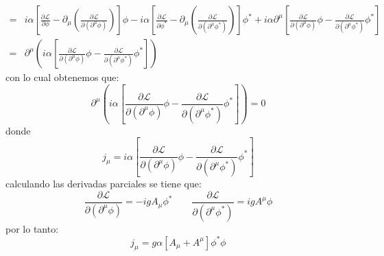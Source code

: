 \begin{itemize}
\begin{align*}
        =& i\alpha \left[ \frac{\partial \mathcal{L}}{\partial \phi} - \partial_\mu \left(\frac{\partial \mathcal{L}}{\partial (\partial^\mu \phi)}\right) \right] \phi-i\alpha \left[ \frac{\partial \mathcal{L}}{\partial \phi^*} - \partial_\mu \left(\frac{\partial \mathcal{L}}{\partial (\partial^\mu \phi^*)}\right) \right] \phi^*  + i\alpha \partial^\mu \left[ \frac{\partial \mathcal{L}}{\partial (\partial^\mu \phi)} \phi  - \frac{\partial \mathcal{L}}{\partial (\partial^\mu {\phi}^*)} {\phi}^* \right]\\
        =& \partial^\mu \left(i\alpha\left[ \frac{\partial \mathcal{L}}{\partial (\partial^\mu \phi)} \phi  - \frac{\partial \mathcal{L}}{\partial (\partial^\mu {\phi}^*)} {\phi}^* \right]\right)
    \end{align*}
    con lo cual obtenemos que:
    \begin{equation*}
        \partial^\mu \left(i\alpha\left[ \frac{\partial \mathcal{L}}{\partial (\partial^\mu \phi)} \phi  - \frac{\partial \mathcal{L}}{\partial (\partial^\mu {\phi}^*)} {\phi}^* \right]\right) = 0
    \end{equation*}
    donde 
     \begin{equation*}
         j_\mu = i\alpha\left[ \frac{\partial \mathcal{L}}{\partial (\partial^\mu \phi)} \phi  - \frac{\partial \mathcal{L}}{\partial (\partial^\mu {\phi}^*)} {\phi}^* \right]
     \end{equation*}
     calculando las derivadas parciales se tiene que:
     \begin{equation*}
        \frac{\partial \mathcal{L}}{\partial (\partial^\mu \phi)} = -igA_\mu \phi^*  \qquad \frac{\partial \mathcal{L}}{\partial (\partial^\mu \phi^*)} = i g A^\mu \phi
     \end{equation*}
     por lo tanto:
     \begin{equation*}
         j_\mu = g\alpha \left[A_\mu +A^\mu \right] \phi^*\phi
     \end{equation*}
\end{itemize}